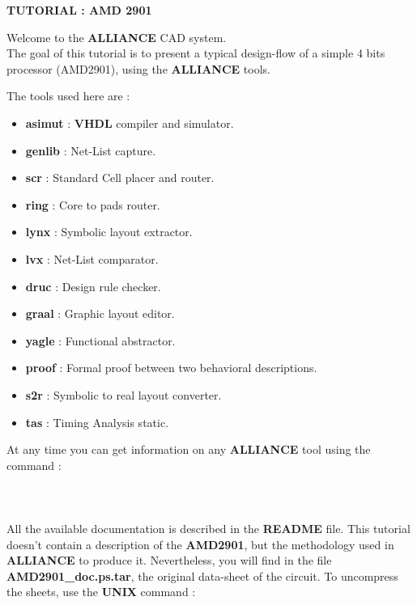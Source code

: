 \documentclass[11pt,a4]{article}
\begin{document}
 

\begin{center}
\Huge\bf TUTORIAL : AMD 2901
\end{center}

Welcome to the {\bf ALLIANCE} CAD system.\\
The goal of this tutorial is to present a typical design-flow of a
simple 4 bits processor (AMD2901), using the {\bf ALLIANCE} tools.

The tools used here are :

\begin{itemize}
\item {\bf asimut} :	{\bf VHDL} compiler and simulator.
\item {\bf genlib} :	Net-List capture.
\item {\bf scr} :	Standard Cell placer and router.
\item {\bf ring} :	Core to pads router.
\item {\bf lynx} :	Symbolic layout extractor.
\item {\bf lvx} :	Net-List comparator.
\item {\bf druc} :	Design rule checker.
\item {\bf graal} :	Graphic layout editor.
\item {\bf yagle} :	Functional abstractor.
\item {\bf proof} :	Formal proof between two behavioral descriptions.
\item {\bf s2r} :	Symbolic to real layout converter.
\item {\bf tas} :	Timing Analysis static.
\end{itemize}
At any time you can get information on any {\bf ALLIANCE} tool using 
the command :\\
\\
\\
\\
All the available documentation is described in the {\bf README} file.
This tutorial doesn't contain a description of the {\bf AMD2901}, but
the methodology used in {\bf ALLIANCE} to produce it.
Nevertheless, you will find in the file {\bf AMD2901\_doc.ps.tar},
 the original data-sheet of the circuit.
To uncompress the sheets, use the {\bf UNIX} command :\\
\\
\\
\end{document}
